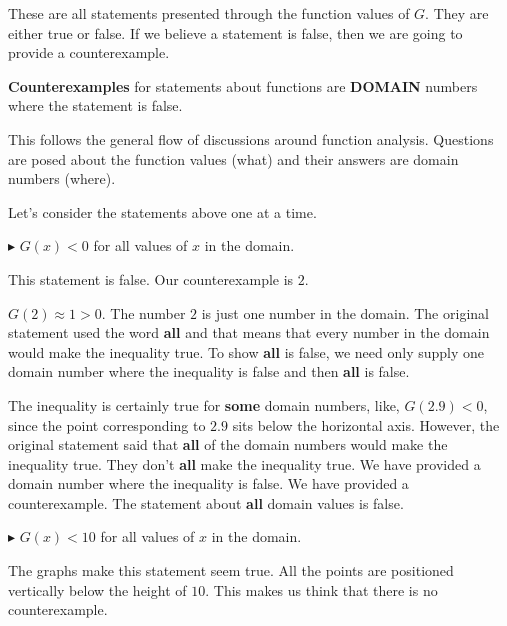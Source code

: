\documentclass{ximera}
\begin{document}
These are all statements presented through the function values of $G$.  They are either true or false.  If we believe a statement is false, then we are going to provide a counterexample. 

\textbf{\textcolor{red!70!black}{Counterexamples}} for statements about functions are \textbf{\textcolor{red!70!black}{DOMAIN}} numbers where the statement is false. 


This follows the general flow of discussions around function analysis.  Questions are posed about the function values (what) and their answers are domain numbers (where). 


Let's consider the statements above one at a time. 












\textbf{\textcolor{red!70!darkgray}{$\blacktriangleright$}} $G(x) < 0$  for all values of $x$ in the domain. 


This statement is false. Our counterexample is $2$.  

$G(2) \approx 1 > 0$. The number $2$ is just one number in the domain.   The original statement used the word \textbf{all} and that means that every number in the domain would make the inequality true.  To show \textbf{all} is false, we need only supply one domain number where the inequality is false and then \textbf{all} is false.

The inequality is certainly true for \textbf{some} domain numbers, like, $G(2.9) < 0$, since the point corresponding to $2.9$ sits below the horizontal axis.  However, the original statement said that \textbf{all} of the domain numbers would make the inequality true. They don't \textbf{all} make the inequality true.  We have provided a domain number where the inequality is false. We have provided a counterexample. The statement about \textbf{all} domain values is false.









\textbf{\textcolor{red!70!darkgray}{$\blacktriangleright$}} $G(x) < 10$  for all values of $x$ in the domain. 

The graphs make this statement seem true.  All the points are positioned vertically below the height of $10$.  This makes us think that there is no counterexample.  
\end{document}
